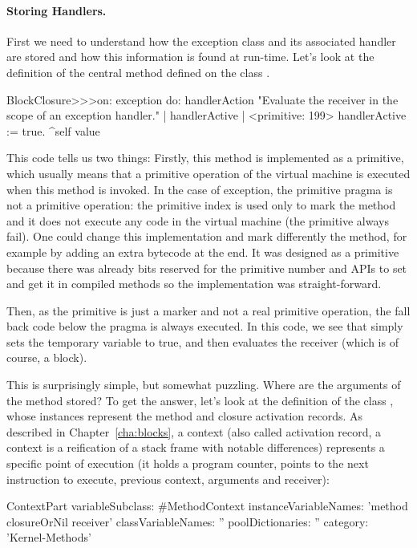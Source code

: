\paragraph{Storing Handlers.}
First we need to understand how the exception class and its associated handler are stored and how this information is found at run-time. Let's look at the definition of the central method  defined on the class . 

\begin{code}{}
BlockClosure>>>on: exception do: handlerAction 
	"Evaluate the receiver in the scope of an exception handler." 
	| handlerActive | 
	<primitive: 199> 
	handlerActive := true. 
	^self value 
\end{code}

This code tells us two things: Firstly, this method is implemented as a primitive, which usually means that a primitive operation of the virtual machine is executed when this method is invoked. In the case of exception, the primitive pragma is not a primitive operation: the primitive index is used only to mark the method and it does not execute any code in the virtual machine (the primitive always fail). One could change this implementation and mark differently the method, for example by adding an extra bytecode at the end. It was designed as a primitive because there was already bits reserved for the primitive number and APIs to set and get it in compiled methods so the implementation was straight-forward.

Then, as the primitive is just a marker and not a real primitive operation, the fall back code below the pragma is always executed. In this code, we see that  simply sets the temporary variable  to true, and then evaluates the receiver (which is of course, a block).  

This is surprisingly simple, but somewhat puzzling.  Where are the arguments of the  method stored?
To get the answer,  let's look at the definition of the class , whose instances represent the method and closure activation records. As described in Chapter~\ref{cha:blocks}, a context (also called activation record, a context is a reification of a stack frame with notable differences) represents a specific point of execution (it holds a program counter, points to the next instruction to execute, previous context, arguments and receiver): 

\begin{code}{}
ContextPart variableSubclass: #MethodContext
	instanceVariableNames: 'method closureOrNil receiver'
	classVariableNames: ''
	poolDictionaries: ''
	category: 'Kernel-Methods'
\end{code}

